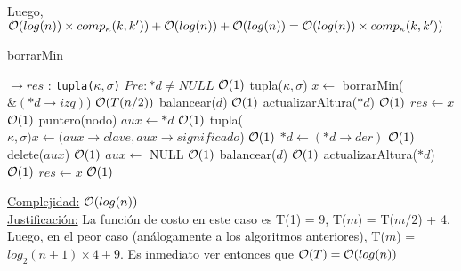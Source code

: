 \begin{Algoritmos}
\begin{algorithm}
Luego, $\mathcal{O}(log(n)) \times comp_{\kappa}(k, k')) + \mathcal{O}(log(n)) + \mathcal{O}(log(n)) = \mathcal{O}(log(n)) \times comp_{\kappa}(k, k'))$  
\end{algorithm}

\begin{algorithm}
\caption{borrarMin}
\begin{algorithmic}[1]
$\to res$ : \texttt{tupla($\kappa, \sigma$)}
	\Comment $Pre: *d \neq NULL$
	\Comment $\mathcal{O}(1)$
		\State tupla($\kappa, \sigma$) $x\gets$ borrarMin($\&(*d\to izq)$)
		\Comment $\mathcal{O}(T(n/2))$
		\State balancear($d$)
		\Comment $\mathcal{O}(1)$
		\State actualizarAltura($*d$)
		\Comment $\mathcal{O}(1)$
		\State $res \gets x$
		\Comment $\mathcal{O}(1)$
	\Else
		\State puntero(nodo) $aux \gets *d$
		\Comment $\mathcal{O}(1)$
		\State tupla($\kappa, \sigma) x \gets (aux\to clave, aux\to significado$)
		\Comment $\mathcal{O}(1)$
		\State $*d\gets (*d\to der)$
		\Comment $\mathcal{O}(1)$
		\State delete($aux$)
		\Comment $\mathcal{O}(1)$
		\State $aux \gets$ NULL
		\Comment $\mathcal{O}(1)$
		\State balancear($d$)
		\Comment $\mathcal{O}(1)$
		\State actualizarAltura($*d$)
		\Comment $\mathcal{O}(1)$
		\State $res \gets x$
		\Comment $\mathcal{O}(1)$
	\EndIf
\EndProcedure
\end{algorithmic}
	\underline{Complejidad:} $\mathcal{O}(log(n))$ \\
	\underline{Justificación:} La función de costo en este caso es T(1) = 9, T($m$) = T($m/2$) + 4. Luego, en el peor caso (análogamente a los algoritmos anteriores), T($m$) = $log_2(n + 1) \times 4 + 9$. Es inmediato ver entonces que $\mathcal{O}(T) = \mathcal{O}(log(n))$
\end{algorithm}

\end{Algoritmos}